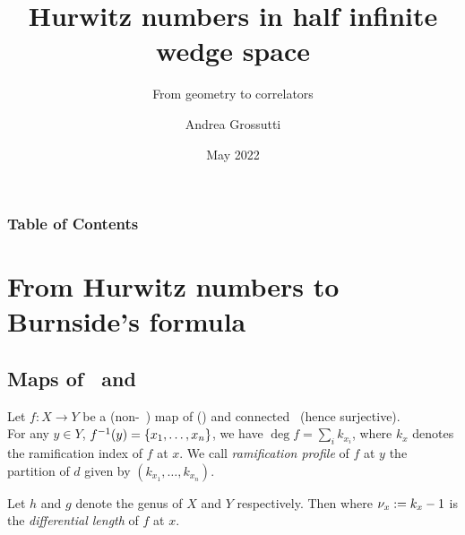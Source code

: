 \documentclass[10pt,handout]{beamer} %
\title[Hurwitz numbers in half infinite wedge space] %
{Hurwitz numbers in half infinite wedge space}
\subtitle{From geometry to correlators}
\author[Arthur, Doe] %
{Andrea Grossutti}
\institute[VFU] %
{SISSA
}
\date[VLC 2021] %
{%
	May 2022}
\begin{document}
\frame{\titlepage}


\begin{frame}
\frametitle{Table of Contents}
\tableofcontents
\end{frame}

\section{From Hurwitz numbers to Burnside's formula}
\subsection{Maps of \rss\ and \hnn}

\begin{frame}

Let $f\colon X\to Y$ be a (non-\const\ \holo) map of (\cpt) and connected \rss\ (hence surjective). \\
For any $y\in Y$, $f^{-1}(y)=\{x_1,\ldots,x_n\}$, we have $\deg f=\sum_ik_{x_i}$, where $k_x$ denotes the ramification index of $f$ at $x$. We call \emph{ramification profile} of $f$ at $y$ the partition of $d$ given by $(k_{x_1},\ldots,k_{x_n})$. \pause

\begin{theorem}
	Let $h$ and $g$ denote the genus of $X$ and $Y$ respectively. Then
	where $\nu_x:=k_x-1$ is the \emph{differential length} of $f$ at $x$.
\end{theorem}
\pause
{}

\end{frame}

\end{document}
